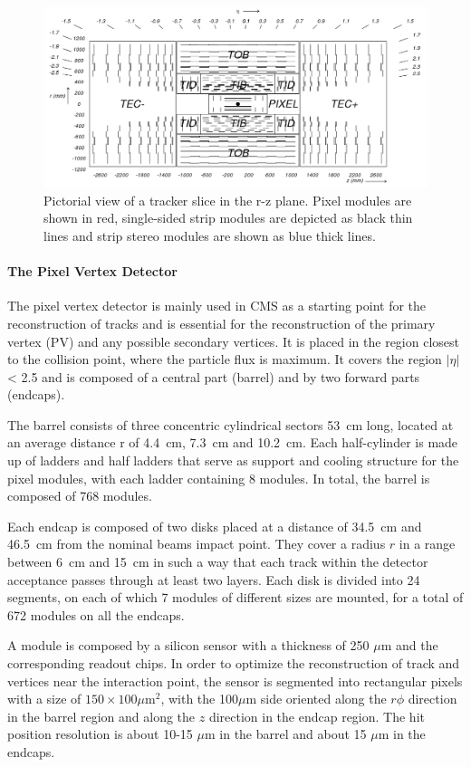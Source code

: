 \begin{figure}
\centering
\includegraphics[scale= 0.3]{../Cap2/fig_cmstracker}
\caption{Pictorial view of a tracker slice in the r-z plane. Pixel modules are shown in
red, single-sided strip modules are depicted as black thin lines and strip stereo modules are
shown as blue thick lines.}
\label{fig_cmstracker}
\end{figure}

\paragraph*{The Pixel Vertex Detector} The pixel vertex detector is mainly used in CMS as a starting point for
the reconstruction of tracks and is essential for the reconstruction of the primary vertex
(PV) and any possible secondary vertices. It is placed in the region closest to the collision
point, where the particle flux is maximum. It covers the region $|\eta|$ < 2.5 and is composed
of a central part (barrel) and by two forward parts (endcaps).

The barrel consists of
three concentric cylindrical sectors 53~cm long, located at an average distance r of 4.4~cm,
7.3~cm and 10.2~cm. Each half-cylinder is made up of ladders and half ladders that serve
as support and cooling structure for the pixel modules, with each ladder containing 8
modules. In total, the barrel is composed of 768 modules.

Each endcap is composed of
two disks placed at a distance of 34.5~cm and 46.5~cm from the nominal beams impact
point. They cover a radius $r$ in a range between 6~cm and 15~cm in such a way that each
track within the detector acceptance passes through at least two layers. Each disk is
divided into 24 segments, on each of which 7 modules of different sizes are mounted, for
a total of 672 modules on all the endcaps.

A module is composed by a silicon sensor with a thickness of
250 $\mu$m and the corresponding readout chips. In
order to optimize the reconstruction of track and vertices near the
interaction point, the sensor is segmented into rectangular pixels
with a size of $150\times100\mu$m$^2$, with the 100$\mu$m side 
oriented along the $r \phi$ direction in the barrel region and along the $z$ direction in the endcap
region. The hit position resolution is about 10-15 $\mu$m in the barrel and
about 15 $\mu$m in the endcaps.


